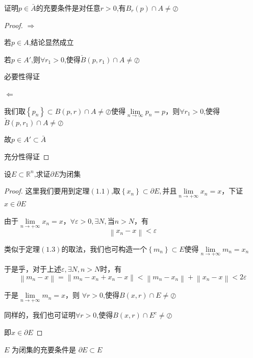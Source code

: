 \documentclass[lang=cn,10pt]{elegantbook}
\begin{document}
\begin{exercise}
	证明$p \in \bar{A}$的充要条件是对任意$r>0$,有$B_{r}(p)\cap A \ne \oslash$
\end{exercise}
\begin{proof}
	
	$\Rightarrow$
	
	若$p\in A$,结论显然成立
	
	若$p\in A'$,则$\forall r_{1}>0$,使得$\check{B}(p,r_{1})\cap A\ne\oslash$
	
	必要性得证
	
	$\Leftarrow$ 
	
	我们取$\left\{ p_n \right\} \subset B(p,r)\cap A\ne\oslash$使得$\underset{n\rightarrow \infty}{\lim}p_n=p$，则$\forall r_{1}>0$,使得$\check{B}(p,r_{1})\cap A\ne\oslash$
	
	故$p\in A'\subset \bar{A}$
	
	充分性得证
\end{proof}
\begin{exercise}
	设$E\subset \mathbb{R} ^n$,求证$\partial E$为闭集
\end{exercise}
\begin{proof}
	
	这里我们要用到定理$(1.1)$,$\text{取}\left\{ x_n \right\} \subset \partial E,\text{并且}\underset{n\rightarrow +\infty}{\lim}x_n=x$，下证$x\in \partial E$
	
	由于$\underset{n\rightarrow +\infty}{\lim}x_n=x$，$\forall \varepsilon >0 ,\exists N,\text{当}n>N$，有
	\begin{equation*}
		\left\| x_n-x \right\| <\varepsilon 
	\end{equation*}
	
	类似于定理$(1.3)$的取法，我们也可构造一个$\left\{ m_n \right\}\subset E $使得$\underset{n\rightarrow +\infty}{\lim}m_n=x_{n}$
	
	于是乎，对于上述$\varepsilon,\exists N,n>N$时，有
	\begin{equation*}
		\left\| m_n-x \right\| =\left\| m_n-x_n+x_n-x \right\| <\left\| m_n-x_n \right\| +\left\| x_n-x \right\| <2\varepsilon 
	\end{equation*}
	
	于是$\underset{n\rightarrow +\infty}{\lim}m_n=x$，则
	$\forall r>0$,使得$B(x,r)\cap E\ne\oslash$
	
	同样的，我们也可证明$\forall r>0$,使得$B(x,r)\cap E^{c}\ne\oslash$
	
	即$x\in \partial E$
\end{proof}
\begin{exercise}
	$E$ 为闭集的充要条件是 $\partial E \subset E$
\end{exercise}
\end{document}

